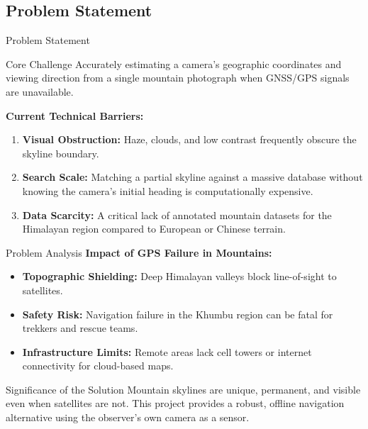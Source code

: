 \subsection{Problem Statement}

\begin{frame}{Problem Statement}
    \begin{alertblock}{Core Challenge}
        Accurately estimating a camera's geographic coordinates and viewing direction from a single mountain photograph when GNSS/GPS signals are unavailable.
    \end{alertblock}

    \vspace{1em}

    \textbf{Current Technical Barriers:}
    \begin{enumerate}
        \item \textbf{Visual Obstruction:} Haze, clouds, and low contrast frequently obscure the skyline boundary.
        \item \textbf{Search Scale:} Matching a partial skyline against a massive database without knowing the camera's initial heading is computationally expensive.
        \item \textbf{Data Scarcity:} A critical lack of annotated mountain datasets for the Himalayan region compared to European or Chinese terrain.
    \end{enumerate}
\end{frame}

\begin{frame}{Problem Analysis}
    \textbf{Impact of GPS Failure in Mountains:}
    \begin{itemize}
        \item \textbf{Topographic Shielding:} Deep Himalayan valleys block line-of-sight to satellites.
        \item \textbf{Safety Risk:} Navigation failure in the Khumbu region can be fatal for trekkers and rescue teams.
        \item \textbf{Infrastructure Limits:} Remote areas lack cell towers or internet connectivity for cloud-based maps.
    \end{itemize}

    \vspace{1em}

    \begin{exampleblock}{Significance of the Solution}
        Mountain skylines are unique, permanent, and visible even when satellites are not. This project provides a robust, offline navigation alternative using the observer's own camera as a sensor.
    \end{exampleblock}
\end{frame}
